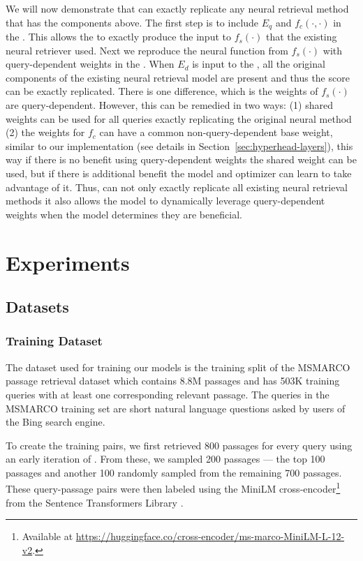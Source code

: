 \documentclass[sigconf,]{acmart}
\begin{document}
We will now demonstrate that \name{} can exactly replicate any neural retrieval method that has the components above. The first step is to include $E_q$ and $f_c(\cdot, \cdot)$ in the \mininame{}. This allows the \mininame{} to exactly produce the input to $f_s(\cdot)$ that the existing neural retriever used. Next we reproduce the neural function from $f_s(\cdot)$ with query-dependent weights in the \mininame{}. When $E_d$ is input to the \mininame{}, all the original components of the existing neural retrieval model are present and thus the score can be exactly replicated. There is one difference, which is the weights of $f_s(\cdot)$ are query-dependent. However, this can be remedied in two ways: (1) shared weights can be used for all queries exactly replicating the original neural method (2) the weights for $f_c$ can have a common non-query-dependent base weight, similar to our implementation (see details in  Section~\ref{sec:hyperhead-layers}), this way if there is no benefit using query-dependent weights the shared weight can be used, but if there is additional benefit the model and optimizer can learn to take advantage of it. Thus, \name{} can not only exactly replicate all existing neural retrieval methods it also allows the model to dynamically leverage query-dependent weights when the model determines they are beneficial.




\section{Experiments}
\subsection{Datasets}
\subsubsection{Training Dataset} \label{training_datasets}
The dataset used for training our models is the training split of the MSMARCO passage retrieval dataset \cite{MSMARCO} which contains 8.8M passages and has 503K training queries with at least one corresponding relevant passage. The queries in the MSMARCO training set are short natural language questions asked by users of the Bing search engine.

To create the training pairs, we first retrieved 800 passages for every query using an early iteration of \name{}. From these, we sampled 200 passages — the top 100 passages and another 100 randomly sampled from the remaining 700 passages. These query-passage pairs were then labeled using the MiniLM cross-encoder\footnote{Available at \url{https://huggingface.co/cross-encoder/ms-marco-MiniLM-L-12-v2}.} from the Sentence Transformers Library \cite{SentenceBERT}. %
\end{document}
